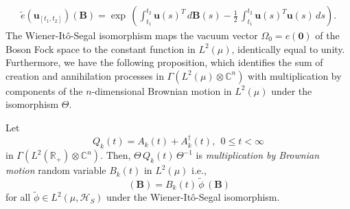 \begin{eqnarray} 
\widetilde{e}(\mathbf{u}_{[t_1,t_2]})(\mathbf{B})={\exp}\,\left( \int_{t_1}^{t_{2}} \mathbf{u}(s)^T\, d\mathbf{B}(s)-  \frac{1}{2}\,\int_{t_1}^{t_{2}} \mathbf{u}(s)^T\mathbf{u}(s)\, ds\right).   \label{chap8-eq5.5}
\end{eqnarray}   
The Wiener-It\^{o}-Segal isomorphism maps the vacuum vector $\Omega_0=e(\mathbf{0})$ of the Boson Fock space  
to the constant function in $L^2(\mu)$, identically equal to unity.  Furthermore, we have the following proposition, 
which identifies the sum of creation and annihilation processes in $\Gamma(L^2(\mu)\otimes \mathbb{C}^n)$  with multiplication by components of the $n$-dimensional Brownian motion    
in $L^{2}(\mu)$ under the isomorphism $\Theta$.

\begin{prop*}
Let 
$$
Q_k(t)=A_k(t)+A^\dag_k(t),\ \  0\leq t<\infty
$$ 
in  $\Gamma(L^2(\mathbb{R}_+)\otimes \mathbb{C}^n)$. Then, $\Theta\, Q_k(t)\, \Theta^{-1}$ is {\em multiplication by Brownian motion} random variable $B_k(t)$ in  $L^{2}(\mu)$ i.e.,  
\begin{equation}
[\, \widetilde{Q}_k(t)\,\, \widetilde{\phi}\,]\, (\mathbf{B})= B_k(t)\, \widetilde{\phi}\,(\mathbf{B}) \label{chap8-eq5.6}
\end{equation}
for all $\widetilde{\phi}\in L^2(\mu, \mathcal{H}_S)$ under the Wiener-It{\^o}-Segal isomorphism.  
\end{prop*}

